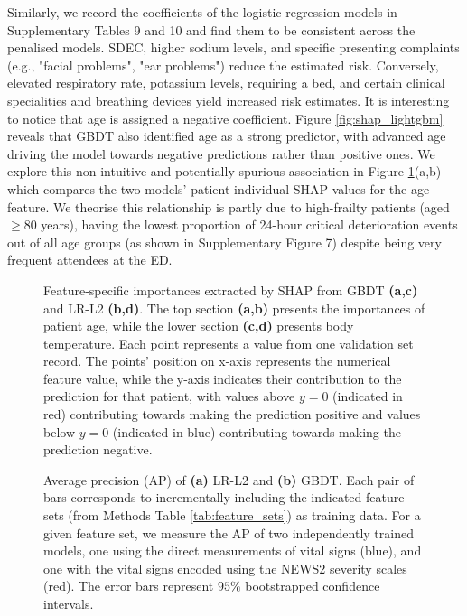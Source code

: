 \documentclass[fleqn,10pt]{wlscirep}
\begin{document}
Similarly, we record the coefficients of the logistic regression models in Supplementary Tables 9 and 10 and find them to be consistent across the penalised models. SDEC, higher sodium levels, and specific presenting complaints (e.g., "facial problems", "ear problems") reduce the estimated risk. Conversely, elevated respiratory rate, potassium levels, requiring a bed, and certain clinical specialities and breathing devices yield increased risk estimates. It is interesting to notice that age is assigned a negative coefficient. Figure \ref{fig:shap_lightgbm} reveals that GBDT also identified age as a strong predictor, with advanced age driving the model towards negative predictions rather than positive ones. We explore this non-intuitive and potentially spurious association in Figure \ref{fig:age_temperature}(a,b) which compares the two models' patient-individual SHAP values for the age feature. We theorise this relationship is partly due to high-frailty patients (aged $\geq 80$ years), having the lowest proportion of 24-hour critical deterioration events out of all age groups (as shown in Supplementary Figure 7) despite being very frequent attendees at the ED.

\begin{figure}[htbp]
    \centering
    
    
    \caption{Feature-specific importances extracted by SHAP from GBDT \textbf{(a,c)} and LR-L2 \textbf{(b,d)}. The top section \textbf{(a,b)} presents the importances of patient age, while the lower section \textbf{(c,d)} presents body temperature. Each point represents a value from one validation set record. The points' position on x-axis represents the numerical feature value, while the y-axis indicates their contribution to the prediction for that patient, with values above $y=0$ (indicated in red) contributing towards making the prediction positive and values below $y=0$ (indicated in blue) contributing towards making the prediction negative.}
    \label{fig:age_temperature}
\end{figure}


\begin{figure}[htbp]
    \centering
    
    \caption{Average precision (AP) of \textbf{(a)} LR-L2 and \textbf{(b)} GBDT. Each pair of bars corresponds to incrementally including the indicated feature sets (from Methods Table \ref{tab:feature_sets}) as training data. For a given feature set, we measure the AP of two independently trained models, one using the direct measurements of vital signs (blue), and one with the vital signs encoded using the NEWS2 severity scales (red). The error bars represent $95\%$ bootstrapped confidence intervals.}
    \label{fig:raw_vs_scored}
\end{figure}
\end{document}
